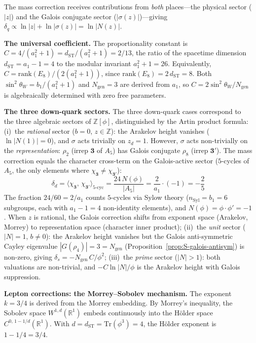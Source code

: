 \documentclass[12pt,a4paper]{article}
\theoremstyle{definition}
\begin{document}
The mass correction receives contributions from \emph{both} places---the physical sector ($|z|$) and the Galois conjugate sector ($|\sigma(z)|$)---giving $\delta_q \propto \ln|z| + \ln|\sigma(z)| = \ln|N(z)|$.

\textbf{The universal coefficient.}  The proportionality constant is $C = 4/(a_1^2+1) = d_{\text{ST}}/(a_1^2+1) = 2/13$, the ratio of the spacetime dimension $d_{\text{ST}} = a_1-1 = 4$ to the modular invariant $a_1^2+1 = 26$.  Equivalently, $C = \mathrm{rank}(E_8)/(2(a_1^2+1))$, since $\mathrm{rank}(E_8) = 2\,d_{\text{ST}} = 8$.  Both $\sin^2\theta_W = b_1/(a_1^2+1)$ and $N_{\text{gen}} = 3$ are derived from $a_1$, so $C = 2\sin^2\theta_W/N_{\text{gen}}$ is algebraically determined with zero free parameters.

\textbf{The three down-quark sectors.}  The three down-quark cases correspond to the three algebraic sectors of $\mathbb{Z}[\phi]$, distinguished by the Artin product formula: (i)~the \emph{rational} sector ($b = 0$, $z \in \mathbb{Z}$): the Arakelov height vanishes ($\ln|N(1)| = 0$), and $\sigma$ acts trivially on $z_d = 1$.  However, $\sigma$ acts non-trivially on the \emph{representation}: $\rho_2$ (irrep $\mathbf{3}$ of $A_5$) has Galois conjugate $\rho_8$ (irrep $\mathbf{3'}$).  The mass correction equals the character cross-term on the Galois-active sector ($5$-cycles of $A_5$, the only elements where $\chi_{\mathbf{3}} \neq \chi_{\mathbf{3'}}$):
\begin{equation}
\delta_d = \bigl\langle\chi_{\mathbf{3}},\,\chi_{\mathbf{3'}}\bigr\rangle_{\!\text{5-cyc}}
= \frac{24\,N(\phi)}{|A_5|}
= \frac{2}{a_1}\cdot(-1) = -\frac{2}{5}
\end{equation}
The fraction $24/60 = 2/a_1$ counts $5$-cycles via Sylow theory ($n_{\mathrm{Syl}} = b_1 = 6$ subgroups, each with $a_1-1 = 4$ non-identity elements), and $N(\phi) = \phi\cdot\phi' = -1$.  When $z$ is rational, the Galois correction shifts from exponent space (Arakelov, Morrey) to representation space (character inner product);
(ii)~the \emph{unit} sector ($|N| = 1$, $b \neq 0$): the Arakelov height vanishes but the Galois anti-symmetric Cayley eigenvalue $|G(\rho_4)| = 3 = N_{\text{gen}}$ (Proposition~\ref{prop:S-galois-antisym}) is non-zero, giving $\delta_s = -N_{\text{gen}}\,C/\phi^2$; (iii)~the \emph{prime} sector ($|N| > 1$): both valuations are non-trivial, and $-C\ln|N|/\phi$ is the Arakelov height with Galois suppression.

\textbf{Lepton corrections: the Morrey--Sobolev mechanism.}  The exponent $k = 3/4$ is derived from the Morrey embedding.  By Morrey's inequality, the Sobolev space $W^{1,d}(\mathbb{R}^1)$ embeds continuously into the H\"{o}lder space $C^{0,\,1-1/d}(\mathbb{R}^1)$.  With $d = d_{\text{ST}} = \mathrm{Tr}(\phi^3) = 4$, the H\"{o}lder exponent is $1 - 1/4 = 3/4$.
\end{document}
